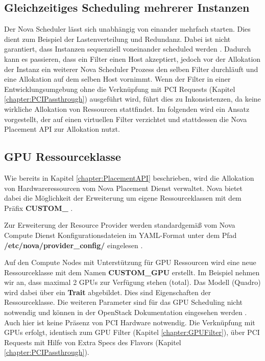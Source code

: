 \documentclass[../Main.tex]{subfiles}
\begin{document}
\subsection{Gleichzeitiges Scheduling mehrerer Instanzen}

Der Nova Scheduler lässt sich unabhängig von einander mehrfach starten. Dies dient zum Beispiel der Lastenverteilung
und Redundanz. Dabei ist nicht garantiert, dass Instanzen sequenziell voneinander scheduled werden \citep{NovaScheduling}.
Dadurch kann es passieren, dass ein Filter einen Host akzeptiert, jedoch vor der Allokation der Instanz ein weiterer Nova Scheduler Prozess den selben
Filter durchläuft und eine Allokation auf dem selben Host vornimmt. Wenn der Filter in einer Entwicklungsumgebung
ohne die Verknüpfung mit PCI Requests (Kapitel \ref{chapter:PCIPassthrough}) ausgeführt wird, führt dies zu
Inkonsistenzen, da keine wirkliche Allokation von Ressourcen stattfindet. Im folgenden wird ein Ansatz vorgestellt, der auf einen virtuellen Filter verzichtet und stattdessen die Nova Placement API
zur Allokation nutzt.

\subsection{GPU Ressourceklasse}
\label{chapter:GPUResourceClass}

Wie bereits in Kapitel \ref{chapter:PlacementAPI} beschrieben, wird die Allokation von Hardwareressourcen vom Nova Placement
Dienst verwaltet. Nova bietet dabei die Möglichkeit der Erweiterung um eigene Ressourceklassen mit dem Präfix \textbf{CUSTOM\_} \citep{NovaCustomResourceClasses}.

Zur Erweiterung der Resource Provider werden standardgemä{\ss} vom Nova Compute Dienst Konfigurationsdateien im YAML-Format unter dem Pfad \textbf{/etc/nova/provider\_config/} eingelesen \citep{NovaConfigurationOptions}.

Auf den Compute Nodes mit Unterstützung für GPU Ressourcen wird eine neue Ressourceklasse mit dem Namen \textbf{CUSTOM\_GPU} erstellt. Im Beispiel
nehmen wir an, dass maximal 2 GPUs zur Verfügung stehen (total). Das Modell (Quadro) wird dabei über
ein \textbf{Trait} abgebildet. Dies sind Eigenschaften der Ressourceklasse. Die weiteren Parameter sind für das GPU Scheduling nicht notwendig und können
in der OpenStack Dokumentation eingesehen werden \citep{ProviderConfigFile}. Auch hier ist keine Präsenz von
PCI Hardware notwendig. Die Verknüpfung mit GPUs erfolgt, identisch zum GPU Filter (Kapitel \ref{chapter:GPUFilter}), über PCI Requests mit Hilfe von
Extra Specs des Flavors (Kapitel \ref{chapter:PCIPassthrough}).
\end{document}

